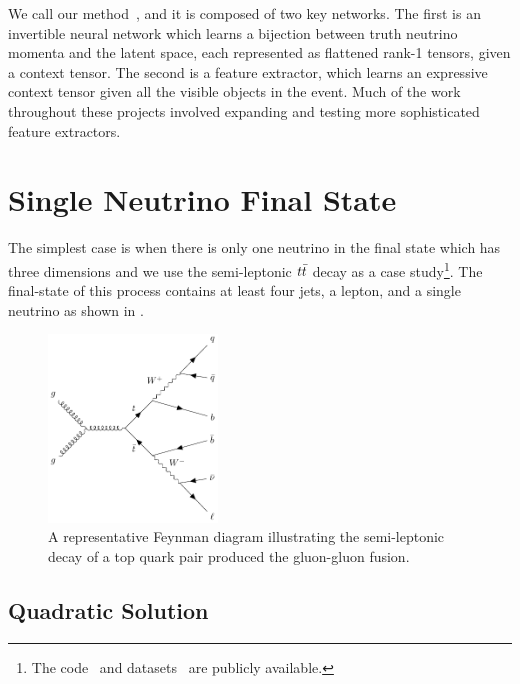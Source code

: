 We call our method~\nuflow, and it is composed of two key networks.
The first is an invertible neural network which learns a bijection between truth neutrino momenta and the latent space, each represented as flattened rank-1 tensors, given a context tensor.
The second is a feature extractor, which learns an expressive context tensor given all the visible objects in the event.
Much of the work throughout these projects involved expanding and testing more sophisticated feature extractors.

\section{Single Neutrino Final State}

The simplest case is when there is only one neutrino in the final state which has three dimensions and we use the semi-leptonic $t\bar{t}$ decay as a case study\footnote{The code~\cite{SemileptonicTtbarNeutrino} and datasets~\cite{NuFlowsCode} are publicly available.}.
The final-state of this process contains at least four jets, a lepton, and a single neutrino as shown in .

\begin{figure}[ht]
    \center
    \includegraphics[width=0.4\textwidth]{Figures/neutrino_unfolding/feynman.pdf}
    \caption{A representative Feynman diagram illustrating the semi-leptonic decay of a top quark pair produced the gluon-gluon fusion.}
    \label{fig:feynman}
\end{figure}

\subsection{Quadratic Solution}

